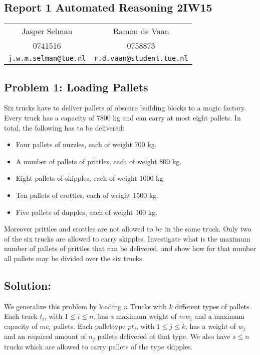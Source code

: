 \documentclass[12pt]{article}
\begin{document}
\begin{center}
\section*{Report 1 Automated Reasoning 2IW15 }
\end{center}
\begin{center}
\begin{tabular}{c c}
Jasper Selman & Ramon de Vaan\\
0741516 & 0758873\\
{\tt j.w.m.selman@tue.nl} & {\tt r.d.vaan@student.tue.nl}
\end{tabular}
\end{center}

\vspace{8mm}

\subsection*{Problem 1: Loading Pallets}

Six trucks have to deliver pallets of obscure building blocks to a magic factory. Every truck has a capacity of 7800 kg and can carry at most eight pallets. In total, the following has to be delivered:
\begin{itemize}
\item Four pallets of nuzzles, each of weight 700 kg.
\item A number of pallets of prittles, each of weight 800 kg.
\item Eight pallets of skipples, each of weight 1000 kg.
\item Ten pallets of crottles, each of weight 1500 kg.
\item Five pallets of dupples, each of weight 100 kg.
\end{itemize}
Moreover prittles and crottles are not allowed to be in the same truck. Only two of the six trucks are allowed to carry skipples. Investigate what is the maximum number of pallets of prittles that can be delivered, and show how for that number all pallets may be divided over the six trucks.

\vspace{8mm}

\subsection*{Solution:}
We generalize this problem by loading $n$ Trucks with $k$ different types of pallets. Each truck $t_i$, with $1 \leq i \leq n$, has a maximum weight of $mw_i$ and a maximum capacity of $mc_i$ pallets. Each pallettype $pt_j$, with $1 \leq j \leq k$, has a weight of $w_j$ and an required amount of $n_j$ pallets delivered of that type. We also have $s \leq n$ trucks which are allowed to carry pallets of the type skipples.
\end{document}
